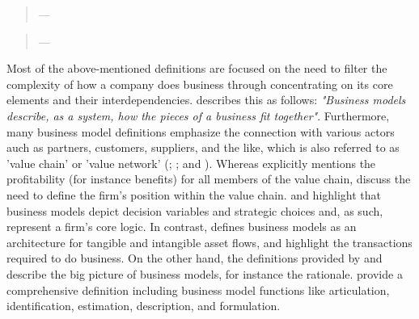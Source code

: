 \begin{quotation}\vspace*{-5pt}{\slshape 
A business model \ldots\xspace consists of four interlocking elements [customer value proposition, profit formula, key resources, and key processes] that, taken together, create and deliver value.}
\vspace*{-7pt}
\begin{flushright}
	--- \citealp[p. 52]{Johnson2008}
\end{flushright}
\end{quotation}

\begin{quotation}\vspace*{-5pt}{\slshape 
A business model describes the rationale of how an organization creates, delivers and captures value.}
\vspace*{-7pt}
\begin{flushright}
	--- \citealp[p. 14]{Osterwalder2010}
\end{flushright}
\end{quotation}

Most of the above-mentioned definitions are focused on the need to filter the complexity of how a company does business through concentrating on its core elements and their interdependencies. \citet[p. 91]{Magretta2002} describes this as follows: \textit{"Business models describe, as a system, how the pieces of a business fit together"}. Furthermore, many business model definitions emphasize the connection with various actors auch as partners, customers, suppliers, and the like, which is also referred to as 'value chain' or 'value network' (\citealp[p. 2]{Timmers1998}; \citealp[pp. 533-534]{Chesbrough2002}; and \citealp[p. 202]{Shafer2005}). Whereas \citet[p. 2]{Timmers1998} explicitly mentions the profitability (for instance benefits) for all members of the value chain, \citet[pp. 533-534]{Chesbrough2002} discuss the need to define the firm's position within the value chain. \citet[p. 727]{Morris2005} and \citet[p. 202]{Shafer2005} highlight that business models depict decision variables and strategic choices and, as such, represent a firm's core logic. In contrast, \citet[p. 2]{Timmers1998} defines business models as an architecture for tangible and intangible asset flows, and \citet[p. 511]{Amit2001} highlight the transactions required to do business. On the other hand, the definitions provided by \citet[p. 52]{Johnson2008} and \citet[p. 14]{Osterwalder2010} describe the big picture of business models, for instance the rationale. \citet[p. 533-534]{Chesbrough2002} provide a comprehensive definition including business model functions like articulation, identification, estimation, description, and formulation.

